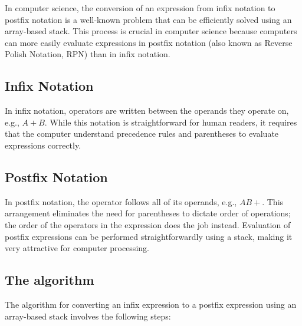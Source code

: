 \documentclass{report}
\begin{document}
    \pagebreak 
    \bigbreak \noindent 
    \begin{concept}
       In computer science, the conversion of an expression from infix notation to postfix notation is a well-known problem that can be efficiently solved using an array-based stack. This process is crucial in computer science because computers can more easily evaluate expressions in postfix notation (also known as Reverse Polish Notation, RPN) than in infix notation.
       \bigbreak \noindent 
       \subsection{Infix Notation}
       \bigbreak \noindent 
       In infix notation, operators are written between the operands they operate on, e.g., $A+B$. While this notation is straightforward for human readers, it requires that the computer understand precedence rules and parentheses to evaluate expressions correctly.
       \bigbreak \noindent 
       \subsection{Postfix Notation}
       \bigbreak \noindent 
       In postfix notation, the operator follows all of its operands, e.g., $AB+$. This arrangement eliminates the need for parentheses to dictate order of operations; the order of the operators in the expression does the job instead. Evaluation of postfix expressions can be performed straightforwardly using a stack, making it very attractive for computer processing.
    \end{concept}
    \bigbreak \noindent 
    \subsection{The algorithm}
The algorithm for converting an infix expression to a postfix expression using an array-based stack involves the following steps:
\end{document}
